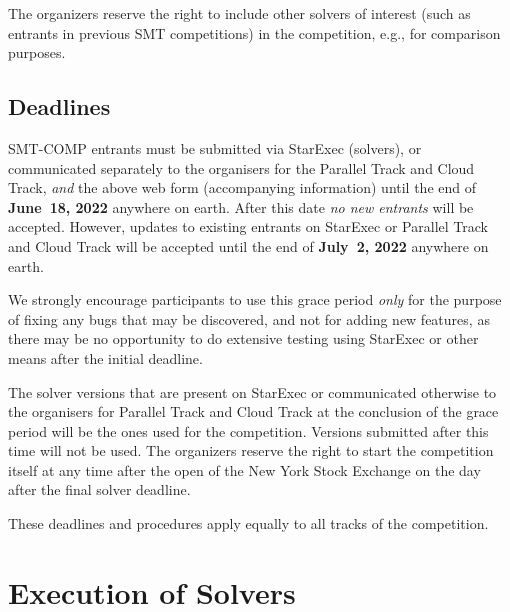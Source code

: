 \documentclass[12pt]{article}
\newcommand{\paralleltrack}{Parallel Track\xspace}
\newcommand{\cloudtrack}{Cloud Track\xspace}
\begin{document}
%
The organizers reserve the right to include other solvers of interest
(such as entrants in previous SMT competitions) in the competition,
e.g., for comparison purposes.

%


\subsection*{Deadlines}

SMT-COMP entrants must be submitted via StarExec (solvers), or
communicated separately to the organisers for the \paralleltrack{} and
\cloudtrack{}, \emph{and}
the above web form (accompanying information) until the end of
{\bf June~18, 2022} anywhere on earth.
After this date \emph{no new entrants} will be accepted.
However, updates to existing entrants on StarExec or \paralleltrack{}
and \cloudtrack{}
will be accepted until the end of {\bf July~2, 2022} anywhere on earth.

We strongly encourage participants to use this grace period
\emph{only} for the purpose of fixing any bugs that may be discovered,
and not for adding new features, as there may be no opportunity to do
extensive testing using StarExec or other means after the initial deadline.

The solver versions that are present on StarExec or communicated
otherwise to the organisers for \paralleltrack{} and \cloudtrack{} at the conclusion of
the grace period will be the ones used for the competition.  Versions
submitted after this time will not be used.  The organizers reserve
the right to start the competition itself at any time after the open
of the New York Stock Exchange on the day after the final solver
deadline.

These deadlines and procedures apply equally to all tracks of the
competition.




\section{Execution of Solvers}
\end{document}
